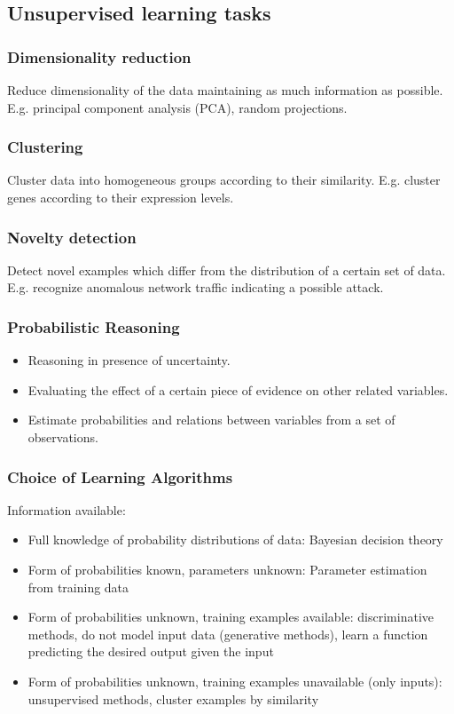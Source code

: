 \documentclass[a4paper, 10pt, titlepage]{article}
\begin{document}
\subsection{Unsupervised learning tasks}
\subsubsection{Dimensionality reduction}
Reduce dimensionality of the data maintaining as much information as possible. E.g. principal component analysis (PCA), random projections.

\subsubsection{Clustering}
Cluster data into homogeneous groups according to their similarity. E.g. cluster genes according to their expression levels.

\subsubsection{Novelty detection}
Detect novel examples which differ from the distribution of a certain set of data. E.g. recognize anomalous network traffic indicating a possible attack.

\subsubsection{Probabilistic Reasoning}
\begin{itemize}
\item Reasoning in presence of uncertainty.
\item Evaluating the effect of a certain piece of evidence on other related variables.
\item Estimate probabilities and relations between variables from a set of observations.
\end{itemize}

\subsubsection{Choice of Learning Algorithms}
Information available:
\begin{itemize}
\item Full knowledge of probability distributions of data: Bayesian decision theory
\item Form of probabilities known, parameters unknown: Parameter estimation from training data
\item Form of probabilities unknown, training examples available: discriminative methods, do not model input data (generative methods), learn a function predicting the
desired output given the input
\item Form of probabilities unknown, training examples unavailable (only inputs): unsupervised methods, cluster examples by similarity
\end{itemize}
\end{document}

